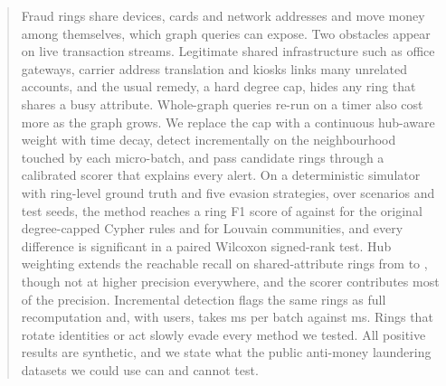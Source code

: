 \begin{abstract}
Fraud rings share devices, cards and network addresses and move money among
themselves, which graph queries can expose. Two obstacles appear on live
transaction streams. Legitimate shared infrastructure such as office gateways,
carrier address translation and kiosks links many unrelated accounts, and the
usual remedy, a hard degree cap, hides any ring that shares a busy attribute.
Whole-graph queries re-run on a timer also cost more as the graph grows. We
replace the cap with a continuous hub-aware weight with time decay, detect
incrementally on the neighbourhood touched by each micro-batch, and pass
candidate rings through a calibrated scorer that explains every alert. On a
deterministic simulator with ring-level ground truth and five evasion
strategies, over \EScenarios{} scenarios and \ESeeds{} test seeds, the method
reaches a ring F1 score of \EPropF{} against \ECapTenF{} for the original
degree-capped Cypher rules and \ELouvainF{} for Louvain communities, and every
difference is significant in a paired Wilcoxon signed-rank test. Hub weighting
extends the reachable recall on shared-attribute rings from \FrCapSMaxR{} to
\FrHubSMaxR{}, though not at higher precision everywhere, and the scorer
contributes most of the precision. Incremental detection flags the same rings
as full recomputation and, with \ScaleMaxUsers{} users, takes \ScaleIncMs{} ms
per batch against \ScaleFullMs{} ms. Rings that rotate identities or act slowly
evade every method we tested. All positive results are synthetic, and we state
what the public anti-money laundering datasets we could use can and cannot test.
\end{abstract}
